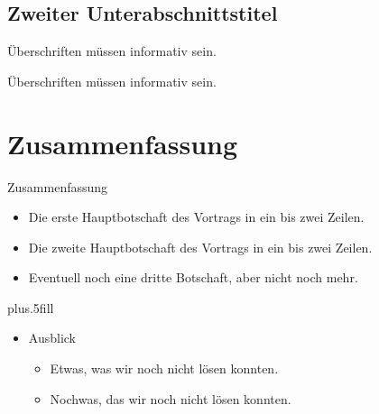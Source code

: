 \documentclass{beamer}
\begin{document}
\subsection{Zweiter Unterabschnittstitel}

\begin{frame}{Überschriften müssen informativ sein.}
\end{frame}

\begin{frame}{Überschriften müssen informativ sein.}
\end{frame}

\section*{Zusammenfassung}

\begin{frame}{Zusammenfassung}

  \begin{itemize}
  \item
    Die \alert{erste Hauptbotschaft} des Vortrags in ein bis zwei Zeilen.
  \item
    Die \alert{zweite Hauptbotschaft} des Vortrags in ein bis zwei Zeilen.
  \item
    Eventuell noch eine \alert{dritte Botschaft}, aber nicht noch mehr.
  \end{itemize}
  
  \vskip0pt plus.5fill
  \begin{itemize}
  \item
    Ausblick
    \begin{itemize}
    \item
      Etwas, was wir noch nicht lösen konnten.
    \item
      Nochwas, das wir noch nicht lösen konnten.
    \end{itemize}
  \end{itemize}
\end{frame}
\end{document}
